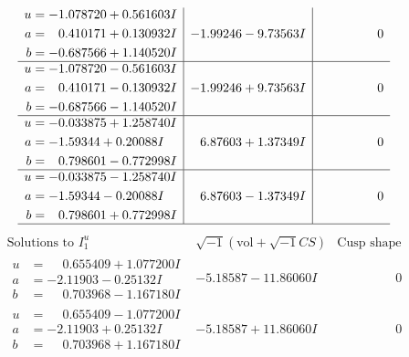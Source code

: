 \documentclass[1p]{elsarticle_modified}
\theoremstyle{definition}
\newcommand{\I}{\sqrt{-1}}
\begin{document}
$$\begin{array}{c|c|c}
\begin{aligned}
u &= -1.078720 + 0.561603 I \\
a &= \phantom{-}0.410171 + 0.130932 I \\
b &= -0.687566 + 1.140520 I\end{aligned}
 & -1.99246 - 9.73563 I & \phantom{-0.000000 } 0 \\ \hline\begin{aligned}
u &= -1.078720 - 0.561603 I \\
a &= \phantom{-}0.410171 - 0.130932 I \\
b &= -0.687566 - 1.140520 I\end{aligned}
 & -1.99246 + 9.73563 I & \phantom{-0.000000 } 0 \\ \hline\begin{aligned}
u &= -0.033875 + 1.258740 I \\
a &= -1.59344 + 0.20088 I \\
b &= \phantom{-}0.798601 - 0.772998 I\end{aligned}
 & \phantom{-}6.87603 + 1.37349 I & \phantom{-0.000000 } 0 \\ \hline\begin{aligned}
u &= -0.033875 - 1.258740 I \\
a &= -1.59344 - 0.20088 I \\
b &= \phantom{-}0.798601 + 0.772998 I\end{aligned}
 & \phantom{-}6.87603 - 1.37349 I & \phantom{-0.000000 } 0\\
 \hline 
 \end{array}$$\newpage$$\begin{array}{c|c|c}  
\text{Solutions to }I^u_{1}& \I (\text{vol} + \sqrt{-1}CS) & \text{Cusp shape}\\
 \hline 
\begin{aligned}
u &= \phantom{-}0.655409 + 1.077200 I \\
a &= -2.11903 - 0.25132 I \\
b &= \phantom{-}0.703968 - 1.167180 I\end{aligned}
 & -5.18587 - 11.86060 I & \phantom{-0.000000 } 0 \\ \hline\begin{aligned}
u &= \phantom{-}0.655409 - 1.077200 I \\
a &= -2.11903 + 0.25132 I \\
b &= \phantom{-}0.703968 + 1.167180 I\end{aligned}
 & -5.18587 + 11.86060 I & \phantom{-0.000000 } 0 \\ \hline\begin{aligned}

\end{aligned}
\end{array}$$
\end{document}
